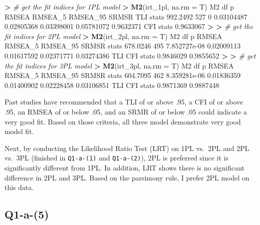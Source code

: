 \documentclass[
]{article}
\newenvironment{Shaded}{\begin{snugshade}}{\end{snugshade}}
\newcommand{\AttributeTok}[1]{\textcolor[rgb]{0.13,0.29,0.53}{#1}}
\newcommand{\CommentTok}[1]{\textcolor[rgb]{0.56,0.35,0.01}{\textit{#1}}}
\newcommand{\DecValTok}[1]{\textcolor[rgb]{0.00,0.00,0.81}{#1}}
\newcommand{\ErrorTok}[1]{\textcolor[rgb]{0.64,0.00,0.00}{\textbf{#1}}}
\newcommand{\FloatTok}[1]{\textcolor[rgb]{0.00,0.00,0.81}{#1}}
\newcommand{\FunctionTok}[1]{\textcolor[rgb]{0.13,0.29,0.53}{\textbf{#1}}}
\newcommand{\NormalTok}[1]{#1}
\newcommand{\SpecialCharTok}[1]{\textcolor[rgb]{0.81,0.36,0.00}{\textbf{#1}}}
\begin{document}
\begin{Shaded}
\begin{Highlighting}[]
\SpecialCharTok{\textgreater{}} \CommentTok{\# get the fit indices for 1PL model}
\ErrorTok{\textgreater{}} \FunctionTok{M2}\NormalTok{(irt\_1pl, }\AttributeTok{na.rm =}\NormalTok{ T)}
\NormalTok{            M2  df p      RMSEA    RMSEA\_5   RMSEA\_95      SRMSR       TLI}
\NormalTok{stats }\FloatTok{992.2492} \DecValTok{527} \DecValTok{0} \FloatTok{0.03104487} \FloatTok{0.02805368} \FloatTok{0.03398001} \FloatTok{0.05781072} \FloatTok{0.9632371}
\NormalTok{            CFI}
\NormalTok{stats }\FloatTok{0.9633067}
\SpecialCharTok{\textgreater{}} 
\ErrorTok{\textgreater{}} \CommentTok{\# get the fit indices for 2PL model}
\ErrorTok{\textgreater{}} \FunctionTok{M2}\NormalTok{(irt\_2pl, }\AttributeTok{na.rm =}\NormalTok{ T)}
\NormalTok{            M2  df            p      RMSEA    RMSEA\_5   RMSEA\_95      SRMSR}
\NormalTok{stats }\FloatTok{678.0246} \DecValTok{495} \FloatTok{7.852727e{-}08} \FloatTok{0.02009113} \FloatTok{0.01617592} \FloatTok{0.02371771} \FloatTok{0.03274386}
\NormalTok{            TLI       CFI}
\NormalTok{stats }\FloatTok{0.9846029} \FloatTok{0.9855652}
\SpecialCharTok{\textgreater{}} 
\ErrorTok{\textgreater{}} \CommentTok{\# get the fit indices for 3PL model}
\ErrorTok{\textgreater{}} \FunctionTok{M2}\NormalTok{(irt\_3pl, }\AttributeTok{na.rm =}\NormalTok{ T)}
\NormalTok{            M2  df            p      RMSEA    RMSEA\_5   RMSEA\_95      SRMSR}
\NormalTok{stats }\FloatTok{604.7095} \DecValTok{462} \FloatTok{8.359281e{-}06} \FloatTok{0.01836359} \FloatTok{0.01400902} \FloatTok{0.02228458} \FloatTok{0.03106851}
\NormalTok{            TLI       CFI}
\NormalTok{stats }\FloatTok{0.9871369} \FloatTok{0.9887448}
\end{Highlighting}
\end{Shaded}

Past studies have recommended that a TLI of or above .95, a CFI of or
above .95, an RMSEA of or below .05, and an SRMR of or below .05 could
indicate a very good fit. Based on those criteria, all three model
demonstrate very good model fit.

Next, by conducting the Likelihood Ratio Test (LRT) on 1PL vs.~2PL and
2PL vs.~3PL (finished in \texttt{Q1-a-(1)} and \texttt{Q1-a-(2)}), 2PL
is preferred since it is significantly different from 1PL. In addition,
LRT shows there is no significant difference in 2PL and 3PL. Based on
the parsimony rule, I prefer 2PL model on this data.

\hypertarget{q1-a-5}{%
\subsection{Q1-a-(5)}\label{q1-a-5}}
\end{document}
